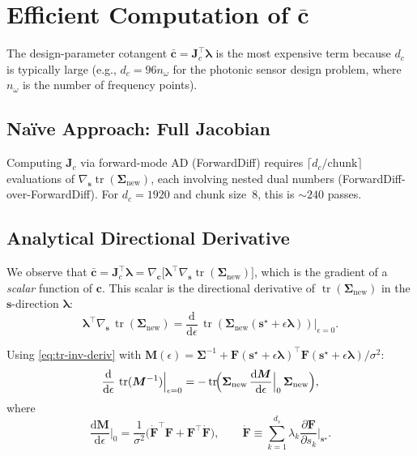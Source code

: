 \documentclass[11pt]{article}
\newcommand{\tr}{\operatorname{tr}}
\newcommand{\dd}{\mathrm{d}}
\newcommand{\bs}{\bm{s}}
\newcommand{\bc}{\bm{c}}
\newcommand{\bla}{\bm{\lambda}}
\newcommand{\sstar}{\bs^{\star}}
\newcommand{\Snew}{\bm{\Sigma}_{\mathrm{new}}}
\theoremstyle{definition}
\begin{document}
\section{Efficient Computation of $\bar{\bc}$}
\label{sec:cbar}

The design-parameter cotangent $\bar{\bc} = \bm{J}_c^\top\bla$ is the
most expensive term because $d_c$ is typically large (e.g., $d_c = 96
n_\omega$ for the photonic sensor design problem, where $n_\omega$ is the
number of frequency points).

\subsection{Na\"ive Approach: Full Jacobian}

Computing $\bm{J}_c$ via forward-mode AD (ForwardDiff) requires
$\lceil d_c/\text{chunk}\rceil$ evaluations of $\nabla_{\bs}\tr(\Snew)$,
each involving nested dual numbers (ForwardDiff-over-ForwardDiff).  For
$d_c = 1920$ and chunk size~8, this is $\sim 240$ passes.

\subsection{Analytical Directional Derivative}

We observe that $\bar{\bc} = \bm{J}_c^\top\bla = \nabla_{\bc}\bigl[
\bla^\top \nabla_{\bs}\tr(\Snew)\bigr]$, which is the gradient of a
\emph{scalar} function of $\bc$.  This scalar is the directional
derivative of $\tr(\Snew)$ in the $\bs$-direction $\bla$:
\begin{equation}
  \bla^\top\nabla_{\bs}\,\tr(\Snew)
  = \frac{\dd}{\dd\epsilon}\,\tr(\Snew(\sstar + \epsilon\bla))
    \Big|_{\epsilon=0}.
  \label{eq:dir-deriv-defn}
\end{equation}

Using \eqref{eq:tr-inv-deriv} with $\bm{M}(\epsilon) = \bm{\Sigma}^{-1}
+ \bm{F}(\sstar+\epsilon\bla)^\top\bm{F}(\sstar+\epsilon\bla)/\sigma^2$:
\begin{equation}
  \frac{\dd}{\dd\epsilon}\,\tr(\bm{M}^{-1})\Big|_{\epsilon=0}
  = -\tr\!\Bigl(\Snew\,\frac{\dd\bm{M}}{\dd\epsilon}\Big|_0\,\Snew\Bigr),
  \label{eq:dir-deriv-trace}
\end{equation}
where
\begin{equation}
  \frac{\dd\bm{M}}{\dd\epsilon}\bigg|_0
  = \frac{1}{\sigma^2}\bigl(
    \dot{\bm{F}}^\top\bm{F} + \bm{F}^\top\dot{\bm{F}}
  \bigr),
  \qquad
  \dot{\bm{F}} \equiv \sum_{k=1}^{d_s} \lambda_k
    \frac{\partial \bm{F}}{\partial s_k}\bigg|_{\sstar}.
  \label{eq:dF-lambda}
\end{equation}
\end{document}
